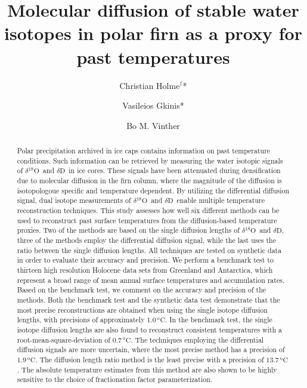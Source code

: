 \documentclass[11pt, draftcls, onecolumn]{IEEEtran} %
\numberwithin{equation}{section}
\numberwithin{table}{section}
\numberwithin{figure}{section}
\newcommand{\delOx}{$\delta{}^{18}\mathrm{O}$}
\newcommand{\delD}{$\delta\mathrm{D}$}
\begin{document}
\title{Molecular diffusion of stable water isotopes in polar firn as a proxy for past temperatures}



\author[a]{Christian Holme$^\dag$*}
\author[a]{Vasileios Gkinis*}
\author[a]{Bo M. Vinther}


\maketitle


\begin{abstract}
Polar precipitation archived in ice caps contains information on past temperature conditions. 
Such information can be retrieved by measuring the water isotopic signals of \delOx~and \delD~in ice cores. 
These signals have been attenuated during densification due to molecular diffusion in the firn column, 
where the magnitude of the diffusion is isotopologoue specific and temperature dependent. 
By utilizing the differential diffusion signal, dual isotope measurements of \delOx~and \delD~enable multiple 
temperature reconstruction techniques. This study assesses how well six different methods can be used to 
reconstruct past surface temperatures from the diffusion-based temperature proxies. Two of the methods are 
based on the single diffusion lengths of \delOx~and \delD, three of the methods employ the differential diffusion signal, 
while the last uses the ratio between the single diffusion lengths. All techniques are tested on synthetic data 
in order to evaluate their accuracy and precision. 
We perform a benchmark test to thirteen high resolution Holocene data sets 
from Greenland and Antarctica, which represent a broad range of mean annual surface temperatures and accumulation rates. 
Based on the benchmark test, we comment on the accuracy and precision of the methods.
Both the benchmark test and the synthetic data test demonstrate 
that the most precise reconstructions are obtained when using the single isotope diffusion lengths, with precisions of approximately $1.0\,^\mathrm{o}\mathrm{C}$. 
In the benchmark test, the single isotope diffusion lengths are also found to reconstruct consistent temperatures with a 
root-mean-square-deviation of $0.7\,^\mathrm{o}\mathrm{C}$.
The techniques employing the differential diffusion signals are more uncertain, 
where the most precise method has a precision of $1.9\,^\mathrm{o}\mathrm{C}$. 
The diffusion length ratio method is the least precise with a precision of $13.7\,^\mathrm{o}\mathrm{C}$. 
The absolute temperature estimates from this method are also shown to be highly sensitive to the choice of fractionation factor parameterization. 
	

\end{abstract}
\end{document}
